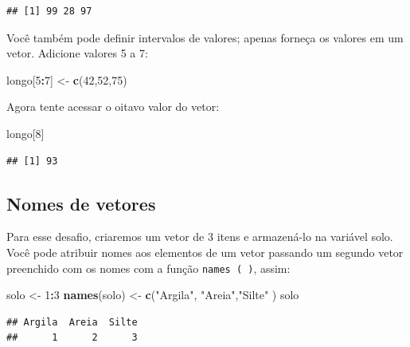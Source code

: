 \documentclass[]{book}
\newenvironment{Shaded}{\begin{snugshade}}{\end{snugshade}}
\newcommand{\DecValTok}[1]{\textcolor[rgb]{0.00,0.00,0.81}{#1}}
\newcommand{\KeywordTok}[1]{\textcolor[rgb]{0.13,0.29,0.53}{\textbf{#1}}}
\newcommand{\NormalTok}[1]{#1}
\newcommand{\OperatorTok}[1]{\textcolor[rgb]{0.81,0.36,0.00}{\textbf{#1}}}
\newcommand{\StringTok}[1]{\textcolor[rgb]{0.31,0.60,0.02}{#1}}
\begin{document}
\begin{verbatim}
## [1] 99 28 97
\end{verbatim}

Você também pode definir intervalos de valores; apenas forneça os valores em um vetor. Adicione valores 5 a 7:

\begin{Shaded}
\begin{Highlighting}[]
\NormalTok{longo[}\DecValTok{5}\OperatorTok{:}\DecValTok{7}\NormalTok{] <-}\StringTok{ }\KeywordTok{c}\NormalTok{(}\DecValTok{42}\NormalTok{,}\DecValTok{52}\NormalTok{,}\DecValTok{75}\NormalTok{)}
\end{Highlighting}
\end{Shaded}

Agora tente acessar o oitavo valor do vetor:

\begin{Shaded}
\begin{Highlighting}[]
\NormalTok{longo[}\DecValTok{8}\NormalTok{]}
\end{Highlighting}
\end{Shaded}

\begin{verbatim}
## [1] 93
\end{verbatim}

\hypertarget{nomes-de-vetores}{%
\subsection{Nomes de vetores}\label{nomes-de-vetores}}

Para esse desafio, criaremos um vetor de 3 itens e armazená-lo na variável solo.
Você pode atribuir nomes aos elementos de um vetor passando um segundo vetor preenchido com os nomes com a função \texttt{names\ (\ )}, assim:

\begin{Shaded}
\begin{Highlighting}[]
\NormalTok{solo <-}\StringTok{ }\DecValTok{1}\OperatorTok{:}\DecValTok{3}
\KeywordTok{names}\NormalTok{(solo) <-}\StringTok{ }\KeywordTok{c}\NormalTok{(}\StringTok{"Argila"}\NormalTok{, }\StringTok{"Areia"}\NormalTok{,}\StringTok{"Silte"}\NormalTok{ )}
\NormalTok{solo}
\end{Highlighting}
\end{Shaded}

\begin{verbatim}
## Argila  Areia  Silte 
##      1      2      3
\end{verbatim}
\end{document}
